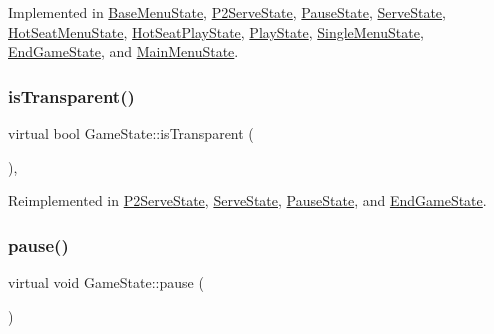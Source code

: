 Implemented in \mbox{\hyperlink{class_base_menu_state_ae29d522c56a4582ce79e113426421741}{Base\+Menu\+State}}, \mbox{\hyperlink{class_p2_serve_state_a7f6cbb73e0d08949e3df08b97ba089f5}{P2\+Serve\+State}}, \mbox{\hyperlink{class_pause_state_a1e3378e3a16fc37c87c12f854d86005b}{Pause\+State}}, \mbox{\hyperlink{class_serve_state_ab39cdbf8c6fe8bbcf67d29033c3e2c15}{Serve\+State}}, \mbox{\hyperlink{class_hot_seat_menu_state_a29beb4656c180d0cfc3b8ca20ae2d172}{Hot\+Seat\+Menu\+State}}, \mbox{\hyperlink{class_hot_seat_play_state_a2d1a6b35aac53c988e7b036d89794e70}{Hot\+Seat\+Play\+State}}, \mbox{\hyperlink{class_play_state_ae5761f09579d0f1800253764f2d68218}{Play\+State}}, \mbox{\hyperlink{class_single_menu_state_a9494d848c97fe4d406f122f3d97bc38d}{Single\+Menu\+State}}, \mbox{\hyperlink{class_end_game_state_ac3abeb54305351ce65b66d519ca3e0c1}{End\+Game\+State}}, and \mbox{\hyperlink{class_main_menu_state_a83efff7f63145d55d1937e76970d2a25}{Main\+Menu\+State}}.

\mbox{\label{class_game_state_af75d6db30190901ed70704d18804fac7}} 
\subsubsection{\texorpdfstring{isTransparent()}{isTransparent()}}
{\footnotesize\ttfamily virtual bool Game\+State\+::is\+Transparent (\begin{DoxyParamCaption}{ }\end{DoxyParamCaption})\hspace{0.3cm}{\ttfamily [inline]}, {\ttfamily [virtual]}}



Reimplemented in \mbox{\hyperlink{class_p2_serve_state_a60e2072a070c980f8c9b9365a83041fd}{P2\+Serve\+State}}, \mbox{\hyperlink{class_serve_state_aad809c6fa11b502fa20403dc62b6601a}{Serve\+State}}, \mbox{\hyperlink{class_pause_state_a1d8e1f454ead5881c3ad396798eb4ac1}{Pause\+State}}, and \mbox{\hyperlink{class_end_game_state_a0cafb4ddc794cdbde37e1624ef02bbf9}{End\+Game\+State}}.

\mbox{\label{class_game_state_aafc908582760099891b37bb380ddd87a}} 
\subsubsection{\texorpdfstring{pause()}{pause()}}
{\footnotesize\ttfamily virtual void Game\+State\+::pause (\begin{DoxyParamCaption}{ }\end{DoxyParamCaption})\hspace{0.3cm}{\ttfamily [pure virtual]}}



